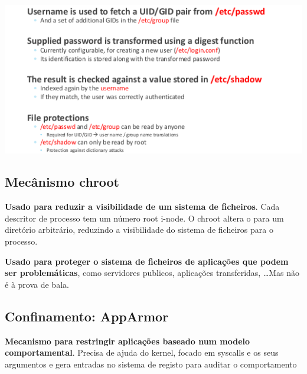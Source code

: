 \documentclass{article}
\begin{document}
\begin{center}
  \includegraphics[scale=0.5]{40}
\end{center}

\subsection{Mecânismo chroot}

\begin{flushleft}
  \textbf{Usado para reduzir a visibilidade de um sistema de ficheiros}.
  Cada descritor de processo tem um número root i-node. O chroot
  altera o para um diretório arbitrário, reduzindo a visibilidade
  do sistema de ficheiros para o processo.
  
  \vspace{2mm}

  \textbf{Usado para proteger o sistema de ficheiros de aplicações
  que podem ser problemáticas}, como servidores publicos,
  aplicações transferidas, \dots Mas não é à prova de bala.
\end{flushleft}

\subsection{Confinamento: AppArmor}

\begin{flushleft}
  \textbf{Mecanismo para restringir aplicações baseado num modelo comportamental}.
  Precisa de ajuda do kernel, focado em syscalls e os seus argumentos e
  gera entradas no sistema de registo para auditar o comportamento
\end{flushleft}

\pagebreak
\end{document}
